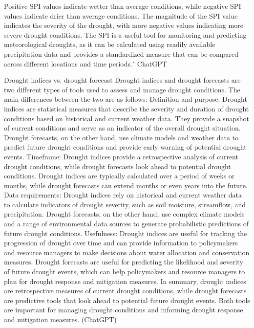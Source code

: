 {Positive SPI values indicate wetter than average conditions, while negative SPI values indicate drier than average conditions. The magnitude of the SPI value indicates the severity of the drought, with more negative values indicating more severe drought conditions. The SPI is a useful tool for monitoring and predicting meteorological droughts, as it can be calculated using readily available precipitation data and provides a standardized measure that can be compared across different locations and time periods." ChatGPT


Drought indices vs. drought forecast
Drought indices and drought forecasts are two different types of tools used to assess and manage drought conditions. The main differences between the two are as follows:
Definition and purpose: Drought indices are statistical measures that describe the severity and duration of drought conditions based on historical and current weather data. They provide a snapshot of current conditions and serve as an indicator of the overall drought situation. Drought forecasts, on the other hand, use climate models and weather data to predict future drought conditions and provide early warning of potential drought events.
Timeframe: Drought indices provide a retrospective analysis of current drought conditions, while drought forecasts look ahead to potential drought conditions. Drought indices are typically calculated over a period of weeks or months, while drought forecasts can extend months or even years into the future.
Data requirements: Drought indices rely on historical and current weather data to calculate indicators of drought severity, such as soil moisture, streamflow, and precipitation. Drought forecasts, on the other hand, use complex climate models and a range of environmental data sources to generate probabilistic predictions of future drought conditions.
Usefulness: Drought indices are useful for tracking the progression of drought over time and can provide information to policymakers and resource managers to make decisions about water allocation and conservation measures. Drought forecasts are useful for predicting the likelihood and severity of future drought events, which can help policymakers and resource managers to plan for drought response and mitigation measures.
In summary, drought indices are retrospective measures of current drought conditions, while drought forecasts are predictive tools that look ahead to potential future drought events. Both tools are important for managing drought conditions and informing drought response and mitigation measures. (ChatGPT)


}
